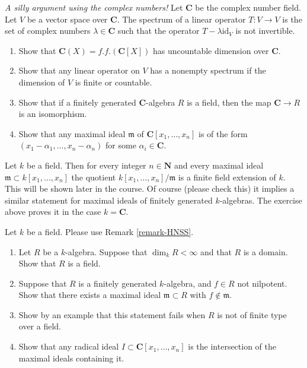 \begin{exercise}
\label{exercise-uncountable}
{\it A silly argument using the complex numbers!}
Let ${\mathbf C}$ be the complex number field. Let $V$ be a vector
space over ${\mathbf C}$. The spectrum of a linear operator
$T : V \to V$ is the set of complex numbers $\lambda \in {\mathbf C}$
such that the operator $T - \lambda \text{id}_V$ is not invertible.
\begin{enumerate}
\item Show that ${\mathbf C}(X) = f.f.({\mathbf C}[X])$
has uncountable dimension over ${\mathbf C}$.
\item Show that any linear operator on $V$ has a
nonempty spectrum if the dimension of $V$ is finite or
countable.
\item Show that if a finitely generated ${\mathbf C}$-algebra
$R$ is a field, then the map ${\mathbf C}\to R$ is an isomorphism.
\item Show that any maximal ideal ${\mathfrak m}$ of
${\mathbf C}[x_1, \ldots, x_n]$ is of the form
$(x_1-\alpha_1, \ldots, x_n-\alpha_n)$ for some $\alpha_i \in {\mathbf C}$.
\end{enumerate}
\end{exercise}

\begin{remark}
\label{remark-HNSS}
Let $k$ be a field. Then for every integer $n\in {\mathbf N}$ and
every maximal ideal ${\mathfrak m} \subset k[x_1, \ldots, x_n]$
the quotient $k[x_1, \ldots, x_n]/{\mathfrak m}$ is a finite field
extension of $k$. This will be shown later in the course. Of course
(please check this) it implies a similar statement for maximal ideals
of finitely generated $k$-algebras. The exercise above proves
it in the case $k = {\mathbf C}$.
\end{remark}

\begin{exercise}
\label{exercise-Hilbert-Nullstellensatz}
Let $k$ be a field. Please use Remark \ref{remark-HNSS}.
\begin{enumerate}
\item Let $R$ be a $k$-algebra. Suppose that $\dim_k R < \infty$
and that $R$ is a domain. Show that $R$ is a field.
\item Suppose that $R$ is a finitely generated $k$-algebra, and
$f\in R$ not nilpotent. Show that there exists a maximal ideal
${\mathfrak m} \subset R$ with $f\not\in {\mathfrak m}$.
\item Show by an example that this statement fails when $R$
is not of finite type over a field.
\item Show that any radical ideal $I \subset {\mathbf C}[x_1, \ldots, x_n]$
is the intersection of the maximal ideals containing it.
\end{enumerate}
\end{exercise}

